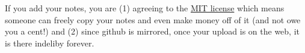 \noindent If you add your notes, you are (1) agreeing to the \href{https://opensource.org/licenses/MIT}{MIT license} which means someone can freely copy your notes and even make money off of it (and not owe you a cent!) and (2) since github is mirrored, once your upload is on the web, it is there indeliby forever. 
